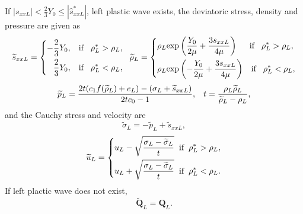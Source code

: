 \documentclass{article}
\numberwithin{equation}{section}
\numberwithin{table}{section}
\begin{document}
\vspace{0.3cm} \hspace{0.4cm}  If $|s_{xxL}| < \frac{2}{3}Y_0 \le |\hat{s}_{xxL}^*| $, left plastic wave exists, the deviatoric stress, density and pressure  are given as
\begin{equation*}
  \widetilde{s}_{xxL} =\left\{ \begin{aligned}
	  -\frac{2}{3}Y_0, \hspace{0.3cm} \text{if} \hspace{0.3cm} \rho_L^* > \rho_L,\\
	  \frac{2}{3}Y_0, \hspace{0.3cm} \text{if} \hspace{0.3cm} \rho_L^* < \rho_L,\\
	\end{aligned}\right.
	\hspace{0.2cm} \widetilde{\rho}_{L} = \left\{ \begin{aligned}
	  & \rho_L \text{exp}\left(\frac{Y_0}{2\mu}+\frac{3 s_{xxL}}{4\mu}\right)  \hspace{0.5cm} \text{if} \hspace{0.3cm} \rho_L^* > \rho_L,\\ 
& \rho_L \text{exp}\left(-\frac{Y_0}{2\mu}+\frac{3 s_{xxL}}{4\mu}\right) 
\hspace{0.3cm} \text{if} \hspace{0.3cm} \rho_L^* < \rho_L,\\ 
  \end{aligned}\right.
 \end{equation*}
\begin{equation*}
  \widetilde{p}_L= \frac{2t(c_1f(\widetilde{\rho}_L)+e_L)-(\sigma_L+\widetilde{s}_{xxL})}{2tc_0-1}, \hspace{0.3cm} 
t=\frac{\rho_L \widetilde{\rho}_L}{\widetilde{\rho}_L-\rho_L},
\end{equation*}
and the Cauchy stress and velocity are
\begin{equation*}
\widetilde{\sigma}_L = -\widetilde{p}_L+\widetilde{s}_{xxL},
\end{equation*}
\begin{equation*}
  \widetilde{u}_L= \left\{
  \begin{aligned}
	u_L-\sqrt{\frac{\sigma_L-\widetilde{\sigma}_L}{t}} \hspace{0.2cm} \text{if} \hspace{0.2cm} \rho_L^* >\rho_L,\\
	u_L+\sqrt{\frac{\sigma_L-\widetilde{\sigma}_L}{t}} \hspace{0.2cm} \text{if} \hspace{0.2cm} \rho_L^* <\rho_L.\\
\end{aligned} \right.
\end{equation*}
If left plactic wave does not exist,
\begin{equation*}
  \widetilde{\bm{Q}}_L = \bm{Q}_L.
\end{equation*}
\end{document}
